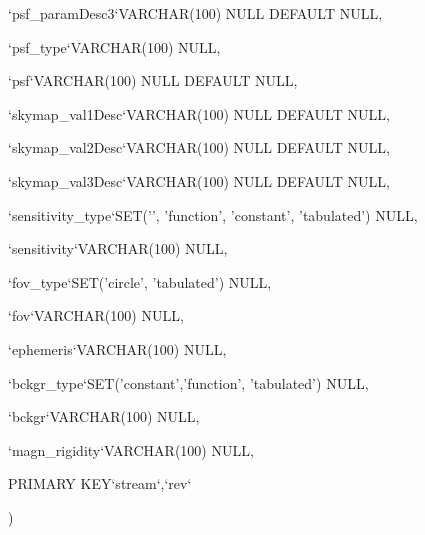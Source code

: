 {{\begin{DoxyParamCaption}
\item[{`psf\-\_\-param\-Desc3`V\-A\-R\-C\-H\-A\-R(100) N\-U\-L\-L D\-E\-F\-A\-U\-L\-T}]{N\-U\-L\-L, }
\item[{`psf\-\_\-type`V\-A\-R\-C\-H\-A\-R(100)}]{N\-U\-L\-L, }
\item[{`psf`V\-A\-R\-C\-H\-A\-R(100) N\-U\-L\-L D\-E\-F\-A\-U\-L\-T}]{N\-U\-L\-L, }
\item[{`skymap\-\_\-val1\-Desc`V\-A\-R\-C\-H\-A\-R(100) N\-U\-L\-L D\-E\-F\-A\-U\-L\-T}]{N\-U\-L\-L, }
\item[{`skymap\-\_\-val2\-Desc`V\-A\-R\-C\-H\-A\-R(100) N\-U\-L\-L D\-E\-F\-A\-U\-L\-T}]{N\-U\-L\-L, }
\item[{`skymap\-\_\-val3\-Desc`V\-A\-R\-C\-H\-A\-R(100) N\-U\-L\-L D\-E\-F\-A\-U\-L\-T}]{N\-U\-L\-L, }
\item[{`sensitivity\-\_\-type`S\-E\-T('', 'function', 'constant', 'tabulated')}]{N\-U\-L\-L, }
\item[{`sensitivity`V\-A\-R\-C\-H\-A\-R(100)}]{N\-U\-L\-L, }
\item[{`fov\-\_\-type`S\-E\-T('circle', 'tabulated')}]{N\-U\-L\-L, }
\item[{`fov`V\-A\-R\-C\-H\-A\-R(100)}]{N\-U\-L\-L, }
\item[{`ephemeris`V\-A\-R\-C\-H\-A\-R(100)}]{N\-U\-L\-L, }
\item[{`bckgr\-\_\-type`S\-E\-T('constant','function', 'tabulated')}]{N\-U\-L\-L, }
\item[{`bckgr`V\-A\-R\-C\-H\-A\-R(100)}]{N\-U\-L\-L, }
\item[{`magn\-\_\-rigidity`V\-A\-R\-C\-H\-A\-R(100)}]{N\-U\-L\-L, }
\item[{P\-R\-I\-M\-A\-R\-Y }]{K\-E\-Y`stream`,`rev`}
\end{DoxyParamCaption}
)}}\label{db__mc__build_8sql_a2932d2685911e3e53938c3498b7f53b9}
